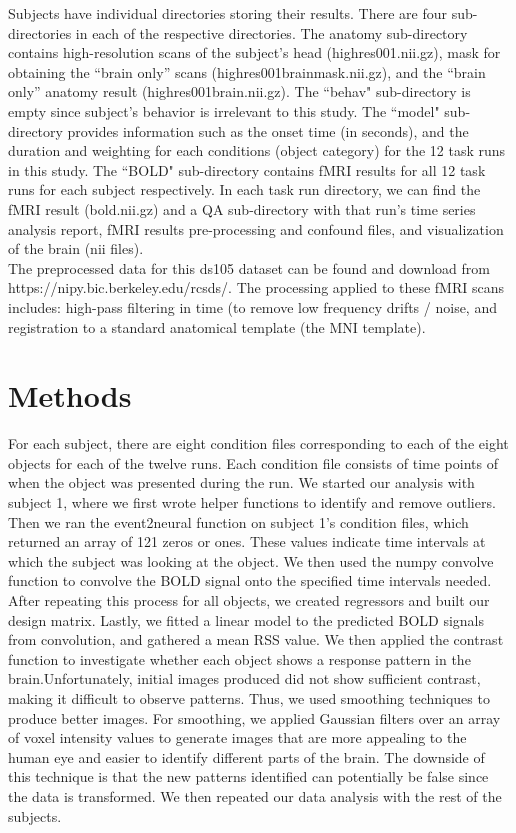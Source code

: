 \documentclass[11pt,twocolumn]{article}
\begin{document}
Subjects have individual directories storing their results. There are four 
sub-directories in each of the respective directories. The anatomy 
sub-directory contains high-resolution scans of the subject's head 
(highres001.nii.gz), mask for obtaining the ``brain only'' scans 
(highres001\textunderscore brain\textunderscore mask.nii.gz), and the 
``brain only'' anatomy result (highres001\textunderscore brain.nii.gz). 
The ``behav" sub-directory is empty since subject's behavior is irrelevant 
to this study. The ``model" sub-directory provides information such as the 
onset time (in seconds), and the duration and weighting for each conditions 
(object category) for the 12 task runs in this study. The ``BOLD" sub-directory 
contains fMRI results for all 12 task runs for each subject respectively. 
In each task run directory, we can find the fMRI result (bold.nii.gz) and 
a QA sub-directory with that run's time series analysis report, fMRI results
pre-processing and confound files, and visualization of the brain (nii files).\\ 

The preprocessed data for this ds105 dataset can be found and download from
https://nipy.bic.berkeley.edu/rcsds/. 
The processing applied to these fMRI scans includes: 
high-pass filtering in time (to remove low frequency drifts / noise, 
and registration to a standard anatomical template (the MNI template).\\

\section{Methods}

For each subject, there are eight condition files corresponding 
to each of the eight objects for each of the twelve runs. Each
condition file consists of time points of when the object was presented 
during the run. We started our analysis with subject 1, where we first wrote 
helper functions to identify and remove outliers.  Then we ran 
the event2neural function on subject 1's condition files, which returned an 
array of 121 zeros or ones. These values indicate
time intervals at which the subject was looking at the object.
We then used the numpy convolve function to convolve the BOLD signal 
onto the specified time intervals needed. After repeating this process 
for all objects, we created regressors and built our design matrix. 
Lastly, we fitted a linear model to the predicted BOLD signals 
from convolution, and gathered a mean RSS value. We then applied the contrast
function to investigate whether each object shows a response pattern in the 
brain.Unfortunately, initial images produced did not show sufficient contrast, 
making it difficult to observe patterns. Thus, we used smoothing techniques to 
produce better images. For smoothing, we applied Gaussian filters over an
array of voxel intensity values to generate images that are more appealing
to the human eye and easier to identify different parts of the brain.
The downside of this technique is that the new patterns identified can
potentially be false since the data is transformed. We then repeated our 
data analysis with the rest of the subjects. \\
\end{document}

